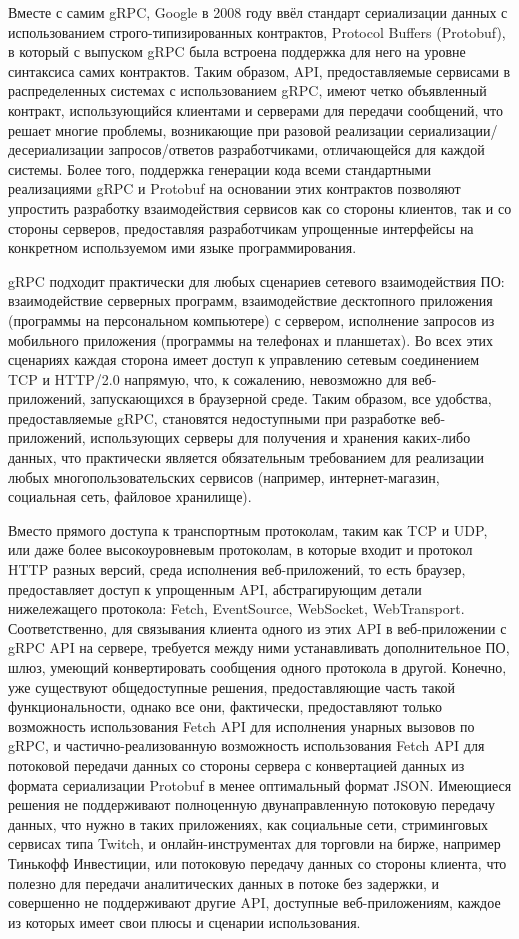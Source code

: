\documentclass[times]{itmo-student-thesis}
\begin{document}
Вместе с самим gRPC, Google в 2008 году ввёл стандарт сериализации данных с использованием строго-типизированных контрактов, Protocol Buffers (Protobuf),
в который с выпуском gRPC была встроена поддержка для него на уровне синтаксиса самих контрактов. Таким образом, API, предоставляемые сервисами в распределенных системах с использованием gRPC,
имеют четко объявленный контракт, использующийся клиентами и серверами для передачи сообщений, что решает многие проблемы,
возникающие при разовой реализации сериализации/десериализации запросов/ответов разработчиками, отличающейся для каждой системы.
Более того, поддержка генерации кода всеми стандартными реализациями gRPC и Protobuf на основании этих контрактов
позволяют упростить разработку взаимодействия сервисов как со стороны клиентов, так и со стороны серверов,
предоставляя разработчикам упрощенные интерфейсы на конкретном используемом ими языке программирования.

gRPC подходит практически для любых сценариев сетевого взаимодействия ПО: взаимодействие серверных программ, взаимодействие десктопного приложения (программы на персональном компьютере) с сервером,
исполнение запросов из мобильного приложения (программы на телефонах и планшетах). Во всех этих сценариях каждая сторона имеет доступ к управлению сетевым соединением TCP и HTTP/2.0 напрямую,
что, к сожалению, невозможно для веб-приложений, запускающихся в браузерной среде. Таким образом, все удобства, предоставляемые gRPC, становятся недоступными при разработке веб-приложений,
использующих серверы для получения и хранения каких-либо данных, что практически является обязательным требованием для реализации любых многопользовательских сервисов (например, интернет-магазин,
социальная сеть, файловое хранилище).

Вместо прямого доступа к транспортным протоколам, таким как TCP и UDP, или даже более высокоуровневым протоколам, в которые входит и протокол HTTP разных версий,
среда исполнения веб-приложений, то есть браузер, предоставляет доступ к упрощенным API, абстрагирующим детали нижележащего протокола: Fetch, EventSource, WebSocket, WebTransport.
Соответственно, для связывания клиента одного из этих API в веб-приложении с gRPC API на сервере, требуется между ними устанавливать дополнительное ПО, шлюз,
умеющий конвертировать сообщения одного протокола в другой. Конечно, уже существуют общедоступные решения, предоставляющие часть такой функциональности,
однако все они, фактически, предоставляют только возможность использования Fetch API для исполнения унарных вызовов по gRPC,
и частично-реализованную возможность использования Fetch API для потоковой передачи данных со стороны сервера с конвертацией данных из формата сериализации Protobuf в менее оптимальный формат JSON.
Имеющиеся решения не поддерживают полноценную двунаправленную потоковую передачу данных, что нужно в таких приложениях, как социальные сети, стриминговых сервисах типа Twitch,
и онлайн-инструментах для торговли на бирже, например Тинькофф Инвестиции, или потоковую передачу данных со стороны клиента, что полезно для передачи аналитических данных в потоке без задержки,
и совершенно не поддерживают другие API, доступные веб-приложениям, каждое из которых имеет свои плюсы и сценарии использования.
\end{document}
